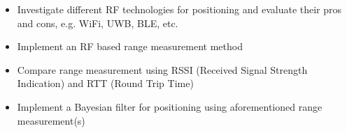 \begin{itemize}
    \item Investigate different RF technologies for positioning and evaluate their pros and cons, e.g. WiFi, UWB, BLE, etc.
    \item Implement an RF based range measurement method
    \item Compare range measurement using RSSI (Received Signal Strength Indication) and RTT (Round Trip Time)
    \item Implement a Bayesian filter for positioning using aforementioned range measurement(s)
\end{itemize}